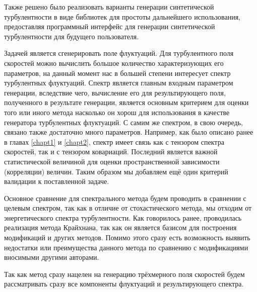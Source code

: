 Также решено было реализовать варианты генерации синтетической турбулентности в виде библиотек для простоты дальнейшего использования, предоставляя программный интерфейс для генерации синтетической турбулентности для будущего пользователя. 

%
%
Задачей является сгенерировать поле флуктуаций. Для турбулентного поля скоростей можно вычислить большое количество характеризующих его параметров, на данный момент нас в большей степени интересует спектр турбулентных флуктуаций. Спектр является главным входным параметром генерации, вследствие чего, вычисление его для результирующего поля, полученного в результате генерации, является основным критерием для оценки того или иного метода насколько он хорош для использования в качестве генератора турбулентных флуктуаций. С самим же спектром, в свою очередь, связано также достаточно много параметров. Например, как было описано ранее в главах \ref{chapt1} и \ref{chapt2}, спектр имеет связь как с тензором спектра скоростей, так и с тензором ковариаций. Последний является важной статистической величиной для оценки пространственной зависимости (корреляции) величин. Таким образом мы добавляем ещё один критерий валидации к поставленной задаче. 

Основное сравнение для спектрального метода будем проводить в сравнении с целевым спектром, так как в отличие от стохастического метода, мы отходим от энергетического спектра турбулентности. Как говорилось ранее, проводилась реализация метода Крайхнана, так как он является базисом для построения модификаций и других методов. Помимо этого сразу есть возможность выявить недостатки или преимущества данного метода по сравнению с модификациями вносимыми другими авторами. 

Так как метод сразу нацелен на генерацию трёхмерного поля скоростей будем рассматривать сразу все компоненты флуктуаций и результирующего спектра. 

